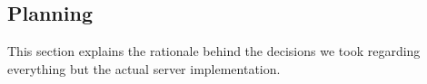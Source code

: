 \subsection{Planning}
This section explains the rationale behind the decisions we took regarding everything but the actual server implementation.






\newpage